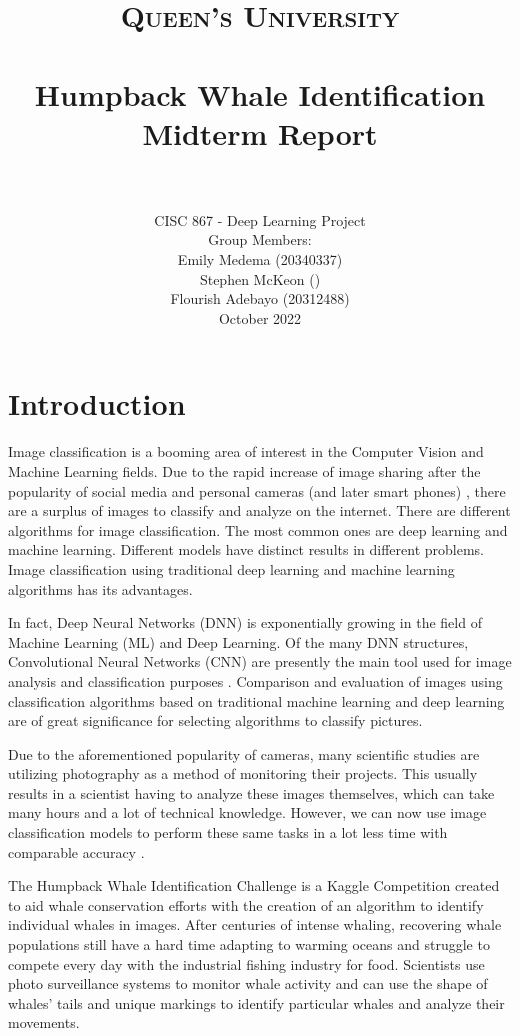 \documentclass[paper=a4, fontsize=11pt]{scrartcl}
\title{
		\usefont{OT1}{bch}{b}{n}
		\normalfont \normalsize \textsc{Queen's University} \\ [25pt]
		\horrule{0.5pt} \\[0.4cm]
		\huge Humpback Whale Identification Midterm Report \\
		\horrule{2pt} \\[0.5cm]
}
\author{
    \normalfont 
      CISC 867 - Deep Learning Project \\
    \normalfont
    Group Members: \\ 
    \normalsize
    Emily Medema (20340337) \\ 
    \normalsize
    Stephen McKeon () \\ 
    \normalsize
    Flourish Adebayo (20312488) \\
    October 2022 \\ [3pt]}
\date{\vspace{-5ex}}
\numberwithin{equation}{section}		%
\numberwithin{table}{section}				%
\begin{document}
\maketitle



\newpage 

\section*{Introduction}\label{sec: intro}

Image classification is a booming area of interest in the Computer Vision and Machine Learning fields. Due to the rapid increase of image sharing after the popularity of social media and personal cameras (and later smart phones) \cite{}, there are a surplus of images to classify and analyze on the internet. There are different algorithms for image classification. The most common ones are deep learning and machine learning. Different models have distinct results in different problems. Image classification using traditional deep learning and machine learning algorithms has its advantages. 


In fact, Deep Neural Networks (DNN) is exponentially growing in the field of Machine Learning (ML) and Deep Learning. Of the many DNN structures, Convolutional Neural Networks (CNN) are presently the main tool used for image analysis and classification purposes \cite{}. Comparison and evaluation of images using classification algorithms based on traditional machine learning and deep learning are of great significance for selecting algorithms to classify pictures. 

Due to the aforementioned popularity of cameras, many scientific studies are utilizing photography as a method of monitoring their projects. This usually results in a scientist having to analyze these images themselves, which can take many hours and a lot of technical knowledge. However, we can now use image classification models to perform these same tasks in a lot less time with comparable accuracy \cite{}. 

The Humpback Whale Identification Challenge is a Kaggle Competition created to aid whale conservation efforts with the creation of an algorithm to identify individual whales in images. After centuries of intense whaling, recovering whale populations still have a hard time adapting to warming oceans and struggle to compete every day with the industrial fishing industry for food. Scientists use photo surveillance systems to monitor whale activity and can use the shape of whales’ tails and unique markings to identify particular whales and analyze their movements.
\end{document}
